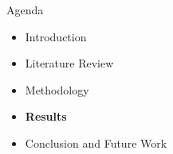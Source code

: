 \begin{frame}{Agenda}
\begin{itemize}
    \item Introduction
    \item Literature Review
    \item Methodology
    \item \textbf{Results}
    \item Conclusion and Future Work
\end{itemize}
\end{frame}